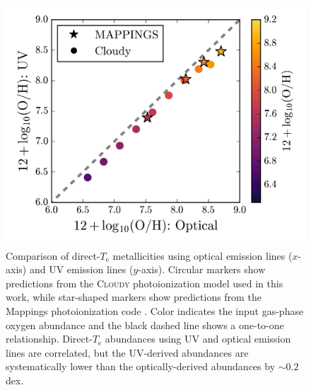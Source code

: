 \documentclass[trackchanges, preprint2]{aastex62}
\newcommand{\Cloudy}{\textsc{Cloudy}\xspace}
\newcommand{\Te}{\ensuremath{T_{\mathrm{e}}}\xspace}
\begin{document}
\begin{figure}
  \begin{center}
    \includegraphics[width=\linewidth]{figs/A2.png}
    \caption{Comparison of direct-\Te metallicities using optical emission lines ($x$-axis) and UV emission lines ($y$-axis). Circular markers show predictions from the \Cloudy photoionization model used in this work, while star-shaped markers show predictions from the {\sc Mappings} photoionization code \citep{Kewley+2019}. Color indicates the input gas-phase oxygen abundance and the black dashed line shows a one-to-one relationship. Direct-\Te abundances using UV and optical emission lines are correlated, but the UV-derived abundances are systematically lower than the optically-derived abundances by $\sim0.2$\,dex.}
    \label{fig:UVoptZ}
  \end{center}
\end{figure}
\end{document}
